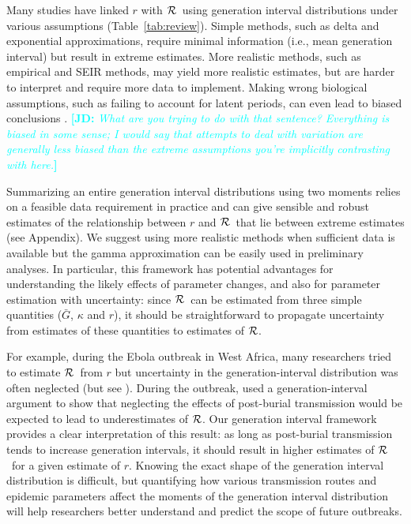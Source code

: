 \documentclass[12pt]{article}
\newcommand{\RR}{\ensuremath{{\cal R}}}
\newcommand{\tref}[1]{Table~\ref{tab:#1}}
\newcommand{\comment}[3]{\textcolor{#1}{\textbf{[#2: }\textsl{#3}\textbf{]}}}
\newcommand{\jd}[1]{\comment{cyan}{JD}{#1}}
\begin{document}
Many studies have linked $r$ with \RR\ using generation interval distributions under various assumptions (\tref{review}).
Simple methods, such as delta and exponential approximations, require minimal information (i.e., mean generation interval) but result in extreme estimates. 
More realistic methods, such as empirical and SEIR methods, may yield more realistic estimates, but are harder to interpret and require more data to implement. 
Making wrong biological assumptions, such as failing to account for latent periods, can even lead to biased conclusions \cite{wearing2005appropriate}.
\jd{What are you trying to do with that sentence? Everything is biased in some sense; I would say that attempts to deal with variation are generally less biased than the extreme assumptions you're implicitly contrasting with here.}

Summarizing an entire generation interval distributions using two moments relies on a feasible data requirement in practice and can give sensible and robust estimates of the relationship between $r$ and \RR\ that lie between extreme estimates (see Appendix).
We suggest using more realistic methods when sufficient data is available but the gamma approximation can be easily used in preliminary analyses.
In particular, this framework has potential advantages for understanding the likely effects of parameter changes, and also for parameter estimation with uncertainty: since \RR\ can be estimated from three simple quantities ($\bar G$, $\kappa$ and $r$), it should be straightforward to propagate uncertainty from estimates of these quantities to estimates of \RR.

For example, during the Ebola outbreak in West Africa, many researchers tried to estimate \RR\ from $r$ \cite{Alth14, AylwBarb14, NishChow15, RiveLofg14, 
KingDome15} but uncertainty in the generation-interval distribution was often neglected (but see \cite{TaylDush16}).  
During the outbreak, \cite{WeitDush15} used a generation-interval argument to show that neglecting the effects of post-burial transmission would be expected to lead to underestimates of \RR.
Our generation interval framework provides a clear interpretation of this result: as long as post-burial transmission tends to increase generation intervals, it should result in higher estimates of \RR\ for a given estimate of $r$.
Knowing the exact shape of the generation interval distribution is difficult, but quantifying how various transmission routes and epidemic parameters affect the moments of the generation interval distribution will help researchers better understand and predict the scope of future outbreaks.
\end{document}
